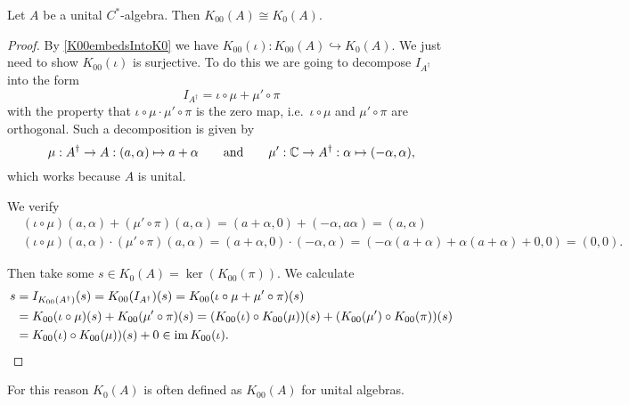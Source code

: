 \begin{proposition}
Let $A$ be a unital $C^*$-algebra. Then $K_{00}(A) \cong K_0(A)$.
\end{proposition}
\begin{proof}
By \ref{K00embedsIntoK0} we have $K_{00}(\iota): K_{00}(A) \hookrightarrow K_{0}(A)$. We just need to show $K_{00}(\iota)$ is surjective. To do this we are going to decompose $I_{A^\dagger}$ into the form
\[ I_{A^\dagger} = \iota\circ \mu + \mu'\circ \pi \]
with the property that $\iota\circ \mu \cdot \mu'\circ \pi$ is the zero map, i.e.\ $\iota\circ \mu$ and $\mu'\circ \pi$ are orthogonal. Such a decomposition is given by
\[ \mu: A^\dagger \to A: (a,\alpha) \mapsto a+\alpha \qquad \text{and}\qquad \mu': \mathbb{C} \to A^\dagger: \alpha \mapsto (-\alpha, \alpha),\]
which works because $A$ is unital.

We verify
\begin{align*}
&(\iota\circ \mu)(a,\alpha) + (\mu'\circ \pi)(a,\alpha) = (a+\alpha, 0) + (-\alpha, a\alpha) = (a,\alpha) \\
&(\iota\circ \mu)(a,\alpha) \cdot (\mu'\circ \pi)(a,\alpha) = (a+\alpha,0) \cdot (-\alpha, \alpha) = (-\alpha(a+\alpha) + \alpha(a+\alpha) + 0,0) = (0,0).
\end{align*}

Then take some $s\in K_0(A) = \ker(K_{00}(\pi))$. We calculate
\begin{align*}
s &= I_{K_{00}(A^\dagger)}(s) = K_{00}(I_{A^\dagger})(s) = K_{00}(\iota\circ \mu + \mu'\circ \pi)(s) \\
&= K_{00}(\iota\circ \mu)(s) + K_{00}(\mu'\circ \pi)(s) = (K_{00}(\iota)\circ K_{00}(\mu))(s) + (K_{00}(\mu')\circ K_{00}(\pi))(s) \\
&= K_{00}(\iota)\circ K_{00}(\mu))(s) + 0 \in \operatorname{im} K_{00}(\iota).
\end{align*}
\end{proof}
For this reason $K_0(A)$ is often defined as $K_{00}(A)$ for unital algebras.

